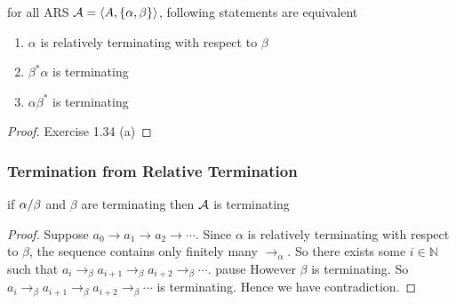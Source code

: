 \documentclass[12pt,aspectratio=169]{beamer}
\begin{document}
\begin{frame}
\begin{lemma}
    for all ARS $\mathcal{A} = \langle A, \{\alpha,\beta\} \rangle$, following statements are equivalent
    \begin{enumerate}
        \item $\alpha$ is relatively terminating with respect to $\beta$
        \item $\beta^*\alpha$ is terminating
        \item $\alpha\beta^*$ is terminating
    \end{enumerate}
\end{lemma}
    \pause
\begin{proof}
    Exercise 1.34 (a) 
\end{proof}

\end{frame}
\newcommand{\bto}{\to_{\beta}}
\newcommand{\ato}{\to_{\alpha}}

\begin{frame}
    \frametitle{Termination from Relative Termination}
    \begin{lemma}
        if $\alpha/\beta$ and $\beta$ are terminating then $\mathcal{A}$ is terminating
    \end{lemma}
    \pause
    \begin{proof}
        Suppose $a_0 \to a_1 \to a_2 \to \cdots$.
        \pause Since $\alpha$ is relatively terminating
        with respect to $\beta$, the sequence contains only finitely many $\ato$.
        \pause
        So there exists some $i \in \mathbb{N}$ such that
        $a_i \bto a_{i+1} \bto a_{i+2} \bto \cdots$. 
        pause
        However $\beta$ is terminating.
        \pause
        So $a_i \bto a_{i+1} \bto a_{i+2} \bto \cdots$ is terminating.
        \pause
        Hence we have contradiction.
    \end{proof}
\end{frame}
\end{document}
